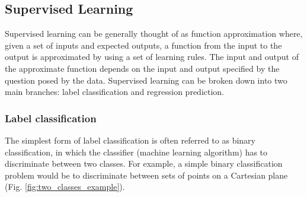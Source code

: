 
\subsection{Supervised Learning}
\label{sec:supervised_learning}

Supervised learning can be generally thought of as function approximation where, given a set of inputs and expected outputs, a function from the input to the output is approximated by using a set of learning rules. The input and output of the approximate function depends on the input and output specified by the question posed by the data. Supervised learning can be broken down into two main branches: label classification and regression prediction. 

\subsubsection{Label classification}
\label{sec:label_classification}
The simplest form of label classification is often referred to as binary classification, in which the classifier (machine learning algorithm) has to discriminate between two classes. For example, a simple binary classification problem would be to discriminate between sets of points on a Cartesian plane (Fig. \ref{fig:two_classes_example}).


